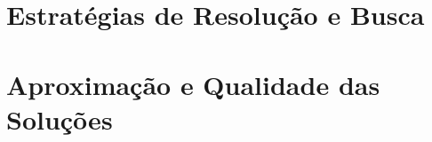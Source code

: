 \documentclass[
	12pt,				%
	openright,			%
	twoside,			%
	a4paper,			%
	english,			%
	brazilian			%
	]{abntex2}
\begin{document}

\frenchspacing 


\imprimircapa
\imprimirfolhaderosto{}

\tableofcontents*
\cleardoublepage

\textual



\part{Estratégias de Resolução e Busca}





\part{Aproximação e Qualidade das Soluções}






\postextual


\end{document}
